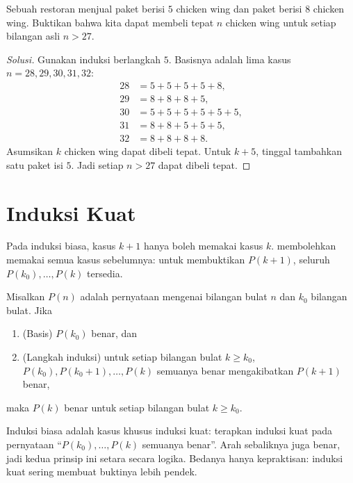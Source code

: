 \documentclass[12pt]{scrartcl}
\begin{document}
\begin{example}
Sebuah restoran menjual paket berisi $5$ chicken wing
dan paket berisi $8$ chicken wing.
Buktikan bahwa kita dapat membeli tepat $n$ chicken wing
untuk setiap bilangan asli $n > 27$.
\end{example}
\begin{proof}[Solusi]
Gunakan induksi berlangkah $5$.
Basisnya adalah lima kasus $n = 28, 29, 30, 31, 32$:
\begin{align*}
28 &= 5 + 5 + 5 + 5 + 8, \\
29 &= 8 + 8 + 8 + 5, \\
30 &= 5 + 5 + 5 + 5 + 5 + 5, \\
31 &= 8 + 8 + 5 + 5 + 5, \\
32 &= 8 + 8 + 8 + 8.
\end{align*}
Asumsikan $k$ chicken wing dapat dibeli tepat.
Untuk $k+5$, tinggal tambahkan satu paket isi $5$.
Jadi setiap $n > 27$ dapat dibeli tepat.
\end{proof}

\section{Induksi Kuat}

Pada induksi biasa, kasus $k+1$ hanya boleh memakai kasus $k$.
 membolehkan memakai semua kasus sebelumnya:
untuk membuktikan $P(k+1)$, seluruh $P(k_0), \dots, P(k)$ tersedia.

\begin{theorem}
Misalkan $P(n)$ adalah pernyataan mengenai bilangan bulat $n$
dan $k_0$ bilangan bulat. Jika
\begin{enumerate}
    \item (Basis) $P(k_0)$ benar, dan
    \item (Langkah induksi) untuk setiap bilangan bulat $k \ge k_0$,
    $P(k_0), P(k_0 + 1), \dots, P(k)$ semuanya benar
    mengakibatkan $P(k+1)$ benar,
\end{enumerate}
maka $P(k)$ benar untuk setiap bilangan bulat $k \ge k_0$.
\end{theorem}

\begin{remark}
Induksi biasa adalah kasus khusus induksi kuat:
terapkan induksi kuat pada pernyataan
``$P(k_0), \dots, P(k)$ semuanya benar''.
Arah sebaliknya juga benar, jadi kedua prinsip ini setara secara logika.
Bedanya hanya kepraktisan: induksi kuat sering membuat buktinya lebih pendek.
\end{remark}
\end{document}
